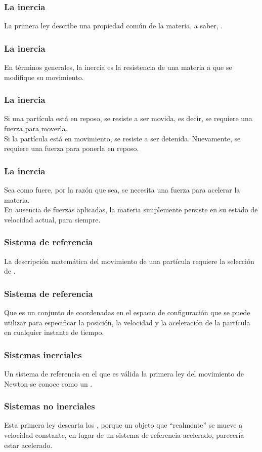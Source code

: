\documentclass[12pt]{beamer}
\begin{document}
\begin{frame}
\frametitle{La inercia}
La primera ley describe una propiedad común de la materia, \pause a saber, .
\end{frame}
\begin{frame}
\frametitle{La inercia}
En términos generales, la inercia es la resistencia de una materia a que se modifique su movimiento.
\end{frame}
\begin{frame}
\frametitle{La inercia}
Si una partícula está en reposo, se resiste a ser movida, \pause es decir, se requiere una fuerza para moverla.
\\
\bigskip
\pause
Si la partícula está en movimiento, se resiste a ser detenida. \pause Nuevamente, se requiere una fuerza para ponerla en reposo.
\end{frame}
\begin{frame}
\frametitle{La inercia}
Sea como fuere, por la razón que sea, se necesita una fuerza para acelerar la materia.
\\
\bigskip
\pause
En ausencia de fuerzas aplicadas, la materia simplemente persiste en su estado de velocidad actual, para siempre.
\end{frame}
\begin{frame}
\frametitle{Sistema de referencia}
La descripción matemática del movimiento de una partícula requiere la selección de .
\end{frame}
\begin{frame}
\frametitle{Sistema de referencia}
Que es un conjunto de coordenadas en el espacio de configuración que se puede utilizar para especificar la posición, la velocidad y la aceleración de la partícula en cualquier instante de tiempo.
\end{frame}
\begin{frame}
\frametitle{Sistemas inerciales}
Un sistema de referencia en el que es válida la primera ley del movimiento de Newton se conoce como un .
\end{frame}
\begin{frame}
\frametitle{Sistemas no inerciales}
Esta primera ley descarta los , \pause porque un objeto que \enquote{realmente} se mueve a velocidad constante, en lugar de un sistema de referencia acelerado, parecería estar acelerado.
\end{frame}
\end{document}
